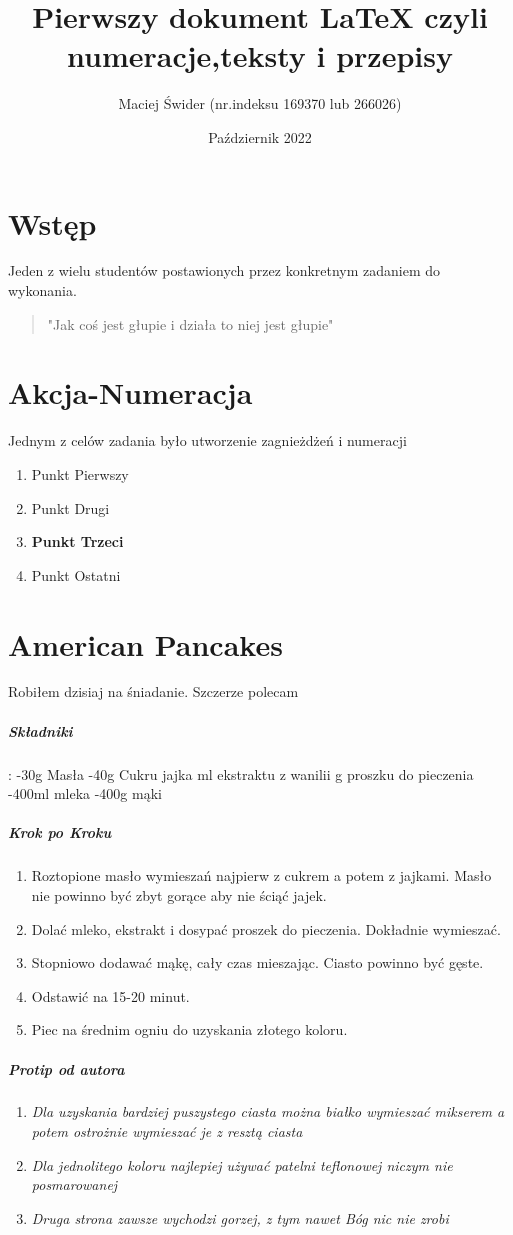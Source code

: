\documentclass[12pt, letterpaper, titlepage]{article}
\title{Pierwszy dokument LaTeX czyli numeracje,teksty i przepisy}
\author{Maciej Świder (nr.indeksu 169370 lub 266026)}
\date{Październik 2022}
\begin{document}
\maketitle
\section{Wstęp}
Jeden z wielu studentów postawionych przez konkretnym zadaniem do wykonania.
\begin{quote}
"Jak coś jest głupie i działa to niej jest głupie"
\end{quote}
\section{Akcja-Numeracja}
Jednym z celów zadania było utworzenie zagnieżdżeń i numeracji
\begin{enumerate}[I]
\item Punkt Pierwszy
\item Punkt Drugi
\item \textbf{Punkt Trzeci}
\item Punkt Ostatni
\end{enumerate}\newpage

\section{American Pancakes}
Robiłem dzisiaj na śniadanie. Szczerze polecam
\subparagraph{Składniki} :		 \newline
-30g Masła \newline
-40g Cukru  jajka  ml ekstraktu z wanilii  g proszku do pieczenia \newline
-400ml mleka \newline
-400g mąki \newline
\subparagraph{Krok po Kroku}
\begin{enumerate}

\item Roztopione masło wymieszań najpierw z cukrem a potem z jajkami. Masło nie powinno być zbyt gorące aby nie ściąć jajek.
\item Dolać mleko, ekstrakt i dosypać proszek do pieczenia. Dokładnie wymieszać.
\item Stopniowo dodawać mąkę, cały czas mieszając. Ciasto powinno być gęste.
\item Odstawić na 15-20 minut.
\item Piec na średnim ogniu do uzyskania złotego koloru.
\end{enumerate}
\subparagraph{Protip od autora}
\begin{enumerate}[*]
\item \textit{Dla uzyskania bardziej puszystego ciasta można białko wymieszać mikserem a potem ostrożnie wymieszać je z resztą ciasta}
\item \textit{Dla jednolitego koloru najlepiej używać patelni teflonowej niczym nie posmarowanej}
\item \textit{Druga strona zawsze wychodzi gorzej, z tym nawet Bóg nic nie zrobi }
\end{enumerate}
\end{document}
